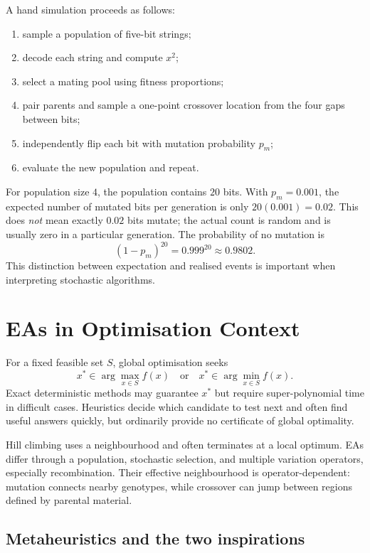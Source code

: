 \documentclass[11pt,a4paper]{article}
\begin{document}
A hand simulation proceeds as follows:

\begin{enumerate}[leftmargin=*]
  \item sample a population of five-bit strings;
  \item decode each string and compute $x^2$;
  \item select a mating pool using fitness proportions;
  \item pair parents and sample a one-point crossover location from the four
        gaps between bits;
  \item independently flip each bit with mutation probability $p_m$;
  \item evaluate the new population and repeat.
\end{enumerate}

For population size $4$, the population contains $20$ bits.  With
$p_m=0.001$, the expected number of mutated bits per generation is only
$20(0.001)=0.02$.  This does \emph{not} mean exactly $0.02$ bits mutate; the
actual count is random and is usually zero in a particular generation.  The
probability of no mutation is
\[
  (1-p_m)^{20}=0.999^{20}\approx 0.9802.
\]
This distinction between expectation and realised events is important when
interpreting stochastic algorithms.

\section{EAs in Optimisation Context}

For a fixed feasible set $S$, global optimisation seeks
\[
  x^*\in\arg\max_{x\in S} f(x)
  \quad\text{or}\quad
  x^*\in\arg\min_{x\in S} f(x).
\]
Exact deterministic methods may guarantee $x^*$ but require
super-polynomial time in difficult cases.  Heuristics decide which candidate
to test next and often find useful answers quickly, but ordinarily provide no
certificate of global optimality.

Hill climbing uses a neighbourhood and often terminates at a local optimum.
EAs differ through a population, stochastic selection, and multiple variation
operators, especially recombination.  Their effective neighbourhood is
operator-dependent: mutation connects nearby genotypes, while crossover can
jump between regions defined by parental material.
\subsection{Metaheuristics and the two inspirations}
\end{document}
